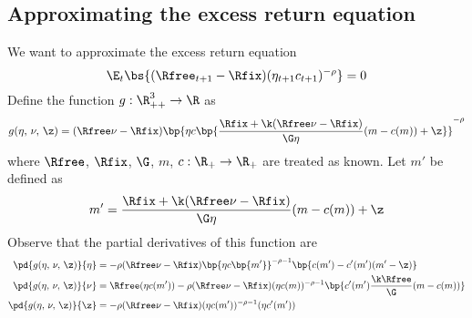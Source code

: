 \subsection{Approximating the excess return equation}

We want to approximate the excess return equation
\[
\E_{t}\bs{(\Rfree_{t+1} - \Rfix)(\eta_{t+1}c_{t+1})^{-\rho}} = 0
\]
Define the function $g : \R_{++}^{3} \to \R$ as
\[
    g(\eta,\,\nu,\,\z) = (\Rfree\nu - \Rfix)\bp{\eta c\bp{\frac{\Rfix + \k(\Rfree\nu - \Rfix)}{\G\eta}(m - c(m)) + \z}}^{-\rho}
\]
where $\Rfree$, $\Rfix$, $\G$, $m$, $c : \R_{+} \to \R_{+}$ are treated as known. Let $m'$ be defined as
\[
m' = \frac{\Rfix + \k(\Rfree\nu - \Rfix)}{\G\eta}(m - c(m)) + \z
\]
Observe that the partial derivatives of this function are
\begin{align*}
    \pd{g(\eta,\,\nu,\,\z)}{\eta} &= -\rho(\Rfree\nu - \Rfix)\bp{\eta c\bp{m'}}^{-\rho-1}\bp{c(m') - c'(m')(m' - \z)}\\
    \pd{g(\eta,\,\nu,\,\z)}{\nu} &= \Rfree(\eta c(m')) - \rho(\Rfree\nu - \Rfix)(\eta c(m))^{-\rho - 1}\bp{c'(m') \frac{\k\Rfree}{\G}(m - c(m))}\\
    \pd{g(\eta,\,\nu,\,\z)}{\z} &= -\rho(\Rfree\nu - \Rfix)(\eta c(m'))^{-\rho-1}(\eta c'(m'))
\end{align*}